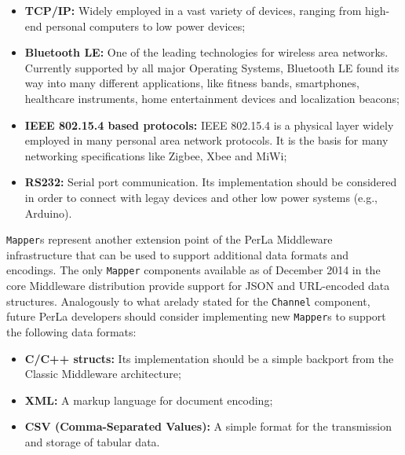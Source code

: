 \begin{itemize}

    \item \textbf{TCP/IP:} Widely employed in a vast variety of devices,
    ranging from high-end personal computers to low power devices;

    \item \textbf{Bluetooth LE:} One of the leading technologies for wireless
    area networks. Currently supported by all major Operating Systems,
    Bluetooth LE found its way into many different applications, like fitness
    bands, smartphones, healthcare instruments, home entertainment devices and
    localization beacons;

    \item \textbf{IEEE 802.15.4 based protocols:} IEEE 802.15.4 is a physical
    layer widely employed in many personal area network protocols. It is the
    basis for many networking specifications like Zigbee, Xbee and MiWi;

    \item \textbf{RS232:} Serial port communication. Its implementation should
    be considered in order to connect with legay devices and other low power
    systems (e.g., Arduino).

\end{itemize}

\texttt{Mapper}s represent another extension point of the PerLa Middleware
infrastructure that can be used to support additional data formats and
encodings. The only \texttt{Mapper} components available as of December 2014
in the core Middleware distribution provide support for JSON and URL-encoded
data structures. Analogously to what arelady stated for the \texttt{Channel}
component, future PerLa developers should consider implementing new
\texttt{Mapper}s to support the following data formats:

\begin{itemize}

    \item \textbf{C/C++ structs:} Its implementation should be a simple
    backport from the Classic Middleware architecture;

    \item \textbf{XML:} A markup language for document encoding;

    \item \textbf{CSV (Comma-Separated Values):} A simple format for the
    transmission and storage of tabular data.

\end{itemize}

